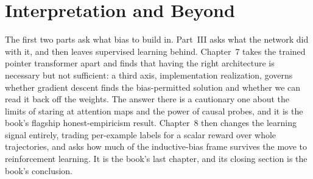 \part{Interpretation and Beyond}

The first two parts ask what bias to build in. Part~III asks what the
network did with it, and then leaves supervised learning behind.
Chapter~7 takes the trained pointer transformer apart and finds that
having the right architecture is necessary but not sufficient: a third
axis, implementation realization, governs whether gradient descent
finds the bias-permitted solution and whether we can read it back off
the weights. The answer there is a cautionary one about the limits of
staring at attention maps and the power of causal probes, and it is the
book's flagship honest-empiricism result. Chapter~8 then changes the
learning signal entirely, trading per-example labels for a scalar
reward over whole trajectories, and asks how much of the
inductive-bias frame survives the move to reinforcement learning. It is
the book's last chapter, and its closing section is the book's
conclusion.



